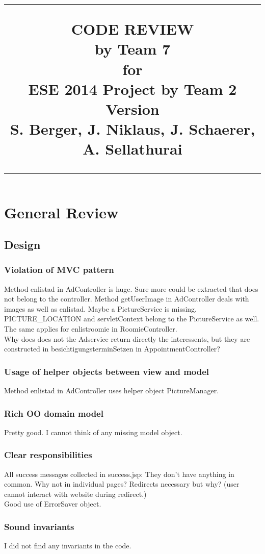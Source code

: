 \documentclass{scrreprt}
\title{%
\flushright
\rule{16cm}{5pt}\vskip1cm
\Huge{CODE REVIEW\\ by Team 7}\\
\vspace{2cm}
for\\
\vspace{2cm}
ESE 2014 Project by Team 2\\
\vspace{2cm}
\LARGE{Version \myversion \\}
\vspace{2cm}
S. Berger, J. Niklaus, J. Schaerer, A. Sellathurai \\
\vfill
\rule{16cm}{5pt}
}
\date{}
\begin{document}
\maketitle
\tableofcontents

\chapter{General Review}
\section{Design}
\subsection{Violation of MVC pattern}
Method enlistad in AdController is huge. Sure more could be extracted that does not belong to the controller. Method getUserImage in AdController deals with images as well as enlistad. Maybe a PictureService is missing. PICTURE_LOCATION and servletContext belong to the PictureService as well. The same applies for enlistroomie in RoomieController.\\
Why does does not the Adservice return directly the interessents, but they are constructed in besichtigungsterminSetzen in AppointmentController?

\subsection{Usage of helper objects between view and model}
Method enlistad in AdController uses helper object PictureManager.

\subsection{Rich OO domain model}
Pretty good. I cannot think of any missing model object.

\subsection{Clear responsibilities}
All success messages collected in success.jsp: They don't have anything in common. Why not in individual pages? Redirects necessary but why? (user cannot interact with website during redirect.)\\
Good use of ErrorSaver object.

\subsection{Sound invariants}
I did not find any invariants in the code.
\end{document}
